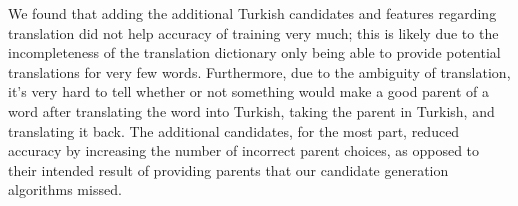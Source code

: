 \documentclass[11pt,twocolumn]{article}
\begin{document}
We found that adding the additional Turkish candidates and features regarding translation
did not help accuracy of training very much; this is likely due to the incompleteness of the translation
dictionary only being able to provide potential translations for very few words. Furthermore, due to the ambiguity
of translation, it's very hard to tell whether or not something would make a good parent of a word after
translating the word into Turkish, taking the parent in Turkish, and translating it back. The additional candidates,
for the most part, reduced accuracy by increasing the number of incorrect parent choices,
as opposed to their intended result of providing parents that our candidate generation algorithms missed.


\end{document}
